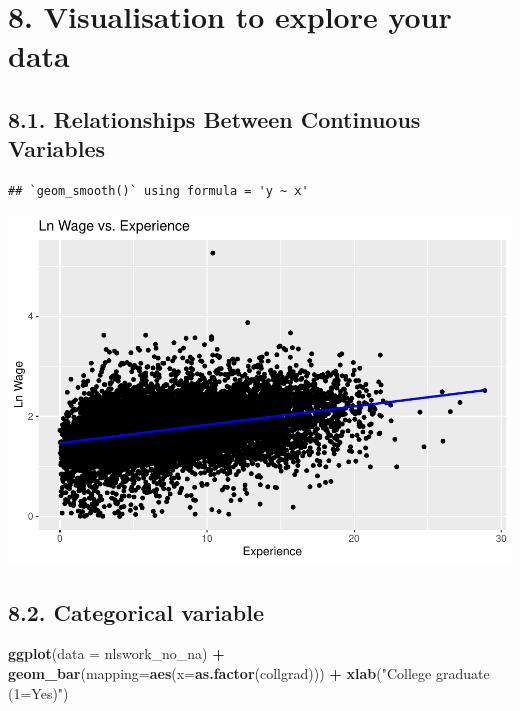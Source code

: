 \documentclass[
]{article}
\newenvironment{Shaded}{\begin{snugshade}}{\end{snugshade}}
\newcommand{\AttributeTok}[1]{\textcolor[rgb]{0.13,0.29,0.53}{#1}}
\newcommand{\FunctionTok}[1]{\textcolor[rgb]{0.13,0.29,0.53}{\textbf{#1}}}
\newcommand{\NormalTok}[1]{#1}
\newcommand{\SpecialCharTok}[1]{\textcolor[rgb]{0.81,0.36,0.00}{\textbf{#1}}}
\newcommand{\StringTok}[1]{\textcolor[rgb]{0.31,0.60,0.02}{#1}}
\begin{document}
\hypertarget{visualisation-to-explore-your-data}{%
\section{8. Visualisation to explore your
data}\label{visualisation-to-explore-your-data}}

\hypertarget{relationships-between-continuous-variables}{%
\subsection{8.1. Relationships Between Continuous
Variables}\label{relationships-between-continuous-variables}}

\begin{verbatim}
## `geom_smooth()` using formula = 'y ~ x'
\end{verbatim}

\includegraphics{RIntro_files/figure-latex/unnamed-chunk-18-1.pdf}

\hypertarget{categorical-variable}{%
\subsection{8.2. Categorical variable}\label{categorical-variable}}

\begin{Shaded}
\begin{Highlighting}[]
\FunctionTok{ggplot}\NormalTok{(}\AttributeTok{data =}\NormalTok{ nlswork\_no\_na) }\SpecialCharTok{+}
  \FunctionTok{geom\_bar}\NormalTok{(}\AttributeTok{mapping=}\FunctionTok{aes}\NormalTok{(}\AttributeTok{x=}\FunctionTok{as.factor}\NormalTok{(collgrad))) }\SpecialCharTok{+}
  \FunctionTok{xlab}\NormalTok{(}\StringTok{"College graduate (1=Yes)"}\NormalTok{)}
\end{Highlighting}
\end{Shaded}
\end{document}
